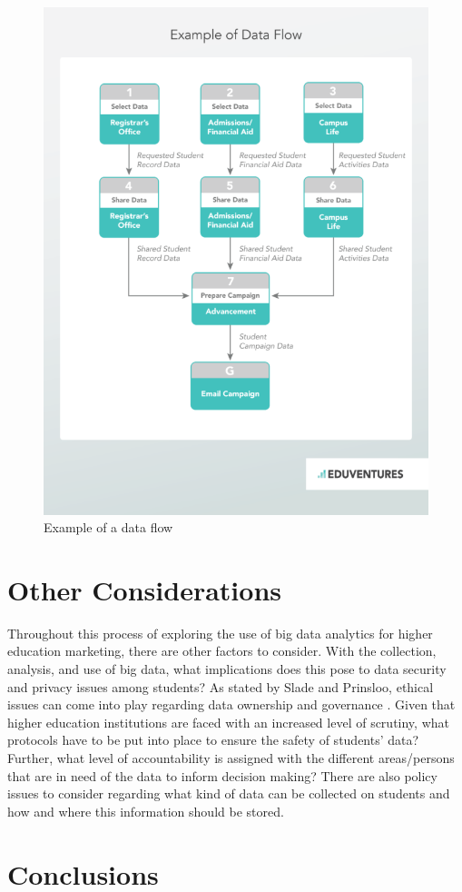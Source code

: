 \documentclass[sigconf]{acmart}
\begin{document}
\begin{figure}[htb]
    \includegraphics[width=0.6\columnwidth]{dataflow2}
    \caption{Example of a data flow \cite{Wiley2016}}
    \label{fig:figure1}
\end{figure}


\section{Other Considerations}
Throughout this process of exploring the use of big data analytics for higher education marketing, there are other factors to consider. With the collection, analysis, and use of big data, what implications does this pose to data security and privacy issues among students? As stated by Slade and Prinsloo, ethical issues can come into play regarding data ownership and governance \cite{Slade2013}. Given that higher education institutions are faced with an increased level of scrutiny, what protocols have to be put into place to ensure the safety of students' data? Further, what level of accountability is assigned with the different areas/persons that are in need of the data to inform decision making? There are also policy issues to consider regarding what kind of data can be collected on students and how and where this information should be stored. 

\section{Conclusions}
\end{document}
